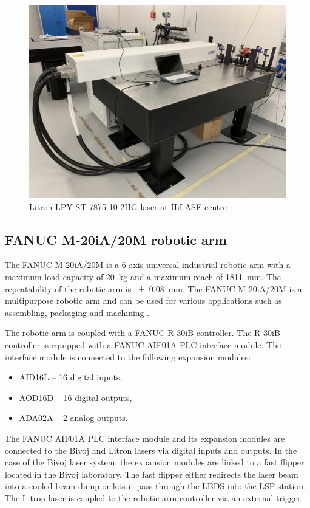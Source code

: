\begin{figure}[h]
    \centering
    \includegraphics[width=0.6\linewidth]{img/litron.JPG}
    \caption{Litron LPY ST 7875-10 2HG laser at HiLASE centre}
    \label{fig:litron}
\end{figure}





\subsection{FANUC M-20iA/20M robotic arm}

The FANUC M-20iA/20M is a 6-axis universal industrial robotic arm with a maximum load capacity of \SI{20}{\kg} and a maximum reach of \SI{1811}{\mm}. The repeatability of the robotic arm is \SI{+-0.08}{\mm}. The FANUC M-20iA/20M is a multipurpose robotic arm and can be used for various applications such as assembling, packaging and machining \cite{fanucrobot}.

The robotic arm is coupled with a FANUC R-30iB controller. The R-30iB controller is equipped with a FANUC AIF01A PLC interface module. The interface module is connected to the following expansion modules:

\begin{itemize}
    \item AID16L -- 16 digital inputs,
    \item AOD16D -- 16 digital outputs,
    \item ADA02A -- 2 analog outputs. \cite{fanucunitmanual}
\end{itemize}

The FANUC AIF01A PLC interface module and its expansion modules are connected to the Bivoj and Litron lasers via digital inputs and outputs. In the case of the Bivoj laser system, the expansion modules are linked to a fast flipper located in the Bivoj laboratory. The fast flipper either redirects the laser beam into a cooled beam dump or lets it pass through the LBDS into the LSP station. The Litron laser is coupled to the robotic arm controller via an external trigger. 

